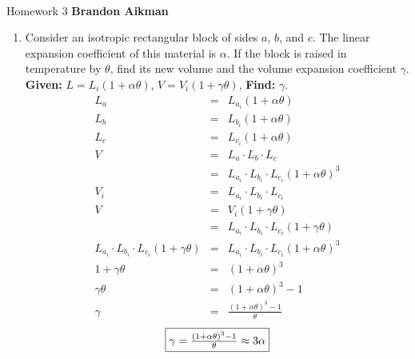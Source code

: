 \documentclass[12pt]{article}
\begin{document}
 \\
Homework 3 \hfill {\bf Brandon Aikman}

\begin{enumerate}
	\item Consider an isotropic rectangular block of sides $a$, $b$, and $c$. The linear expansion coefficient of this material is $\alpha$. If the block is raised in temperature by $\theta$, find its new volume and the volume expansion coefficient $\gamma$.\\
	\textbf {Given: } $L = L_i (1 + \alpha\theta)$, $V = V_i (1 + \gamma\theta)$, \textbf{Find: }$\gamma$.
	\begin{eqnarray*}
		L_a &=& L_{a_i} (1 + \alpha\theta)\\
		L_b &=& L_{b_i} (1 + \alpha\theta)\\
		L_c &=& L_{c_i} (1 + \alpha\theta)\\
		V &=& L_a \cdot L_b \cdot L_c\\
		&=& L_{a_i} \cdot L_{b_i} \cdot L_{c_i} (1 + \alpha\theta)^3\\
		V_i &=& L_{a_i} \cdot L_{b_i} \cdot L_{c_i}\\ 
		V &=& V_i (1 + \gamma\theta)\\
		&=& L_{a_i} \cdot L_{b_i} \cdot L_{c_i} (1 + \gamma\theta)\\
		L_{a_i} \cdot L_{b_i} \cdot L_{c_i} (1 + \gamma\theta) &=& L_{a_i} \cdot L_{b_i} \cdot L_{c_i} (1 + \alpha\theta)^3\\
		1 + \gamma\theta &=& (1 + \alpha\theta)^3\\
		\gamma\theta &=& (1 + \alpha\theta)^3 - 1\\
		\gamma &=& \frac{(1 + \alpha\theta)^3 - 1}{\theta}
	\end{eqnarray*}
	$$\fbox{$\gamma = \frac{(1 + \alpha\theta)^3 - 1}{\theta} \approx 3\alpha$}$$	
	

\end{enumerate}
\end{document}
